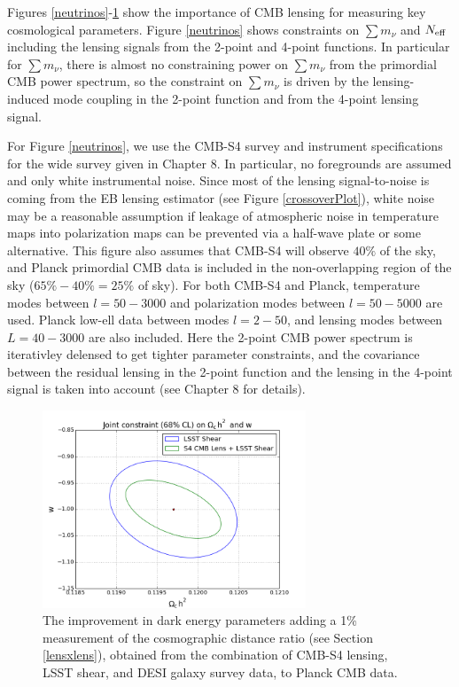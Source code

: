 Figures \ref{neutrinos}-\ref{darkEnergy} show the importance of CMB lensing for measuring key cosmological parameters.  Figure \ref{neutrinos} shows constraints on $\sum {m_\nu}$ and $N_{\rm{eff}}$ including the lensing signals from the 2-point and 4-point functions.  In particular for $\sum {m_\nu}$, there is almost no constraining power on $\sum {m_\nu}$ from the primordial CMB power spectrum, so the constraint on $\sum {m_\nu}$ is driven by the lensing-induced mode coupling in the 2-point function and from the 4-point lensing signal.  

For Figure \ref{neutrinos}, we use the CMB-S4 survey and instrument specifications for the wide survey given in Chapter 8.  In particular, no foregrounds are assumed and only white instrumental noise.  Since most of the lensing signal-to-noise is coming from the EB lensing estimator (see Figure \ref{crossoverPlot}), white noise may be a reasonable assumption if leakage of atmospheric noise in temperature maps into polarization maps can be prevented via a half-wave plate or some alternative.  This figure also assumes that CMB-S4 will observe $40\%$ of the sky, and Planck primordial CMB data is included in the non-overlapping region of the sky ($65\% - 40\% = 25\%$ of sky).  For both CMB-S4 and Planck, temperature modes between $l=50-3000$ and polarization modes between $l=50-5000$ are used.  Planck low-ell data between modes $l=2-50$, and lensing modes between $L=40-3000$ are also included.  Here the 2-point CMB power spectrum is iterativley delensed to get tighter parameter constraints, and the covariance between the residual lensing in the 2-point function and the lensing in the 4-point signal is taken into account (see Chapter 8 for details).     

\begin{figure}[htbp]
\centering
\includegraphics[width=0.7\textwidth]{CMBLensing/darkEnergy.png}
\caption{The improvement in dark energy parameters adding a 1\% measurement of the cosmographic distance ratio (see Section \ref{lensxlens}), obtained from the combination of CMB-S4 lensing, LSST shear, and DESI galaxy survey data, to Planck CMB data.}
\label{darkEnergy}
\end{figure}

